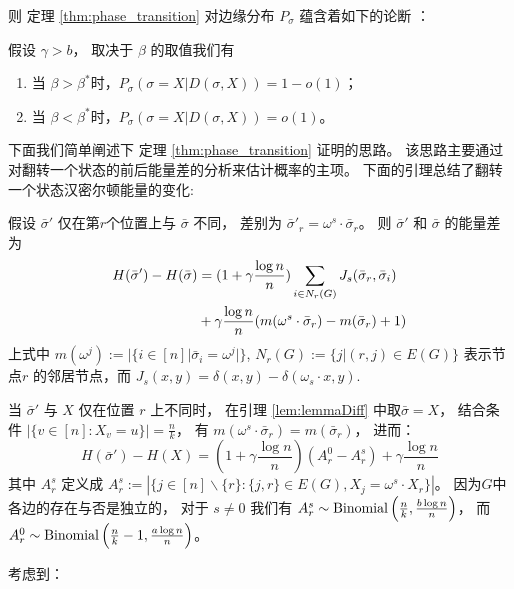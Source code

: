 则 定理 \ref{thm:phase_transition} 
对边缘分布 $P_{\sigma}$ 蕴含着如下的论断
：
\begin{corollary}\label{cor:phase4}
假设 $\gamma > b$， 取决于 $\beta$ 的取值我们有
\begin{enumerate}
	\item 当 $\beta > \beta^*$时，$P_{\sigma}(\sigma = X | D(\sigma, X))  = 1-o(1)$；
	\item 当 $\beta < \beta^*$时，$P_{\sigma}(\sigma = X | D(\sigma, X))  = o(1)$。
\end{enumerate}
\end{corollary}

下面我们简单阐述下 定理 \ref{thm:phase_transition} 证明的思路。
该思路主要通过对翻转一个状态的前后能量差的分析来估计概率的主项。
下面的引理总结了翻转一个状态汉密尔顿能量的变化:
\begin{lemma}\label{lem:lemmaDiff}
	假设 $\bar{\sigma}'$ 仅在第$r$个位置上与 $\bar{\sigma}$ 不同，
	差别为 $\bar{\sigma}'_r = \omega^s \cdot \bar{\sigma}_r$。
	则 $\bar{\sigma}'$ 和 $\bar{\sigma}$ 的能量差为
\begin{align}
	H(\bar{\sigma}') - H(\bar{\sigma}) &= (1+\gamma \frac{\log n}{n})\sum_{i \in N_r(G)} J_s(\bar{\sigma}_r, \bar{\sigma}_i)
	\notag \\
	&+ \gamma \frac{\log n}{n} (m(\omega^s \cdot \bar{\sigma}_r)-m(\bar{\sigma}_r)+1) \label{eq:DeltaH}
	\end{align}
	上式中 $m(\omega^j) := |\{i \in [n] | \bar{\sigma}_i = \omega^j | \}$, 
	$N_r(G):=\{j | (r, j) \in E(G) \}$ 表示节点$r$
	的邻居节点，而 $J_s(x, y) = \delta(x, y) - \delta(\omega_s \cdot x, y)$.
\end{lemma}
\begin{remark}\label{re:energy_diff}
	当 $\bar{\sigma}'$ 与 $X$ 仅在位置 $r$
	上不同时， 在引理 \ref{lem:lemmaDiff}
	中取$\bar{\sigma}=X$，
	结合条件  $|\{v \in [n] : X_v = u\}| = \frac{n}{k}$，
	有 $m(\omega^s \cdot \bar{\sigma}_r)
	=m(\bar{\sigma}_r)$，
	进而：
	\begin{equation}\label{eq:energy_diff}
	H(\bar{\sigma}') - H(X) = (1+\gamma \frac{\log n}{n})(A^0_r - A^s_r) + \gamma\frac{\log n}{n}
	\end{equation}
	其中 $A^s_r$ 定义成
	$A^s_r := |\{j \in [n]\backslash \{r\}: \{j, r\} \in E(G), X_j = \omega^s \cdot X_r \}|$。
	因为$G$中各边的存在与否是独立的，
	对于 $s\neq 0$
	我们有 $A^s_r \sim \operatorname{Binomial} \left(
	  \frac{n}{k}, \frac{b \log n}{n} \right) $，
	而 $A^0_r \sim \operatorname{Binomial}
	\left(
	  \frac{n}{k}-1, \frac{a \log n}{n} \right)$。	
\end{remark}
考虑到：
